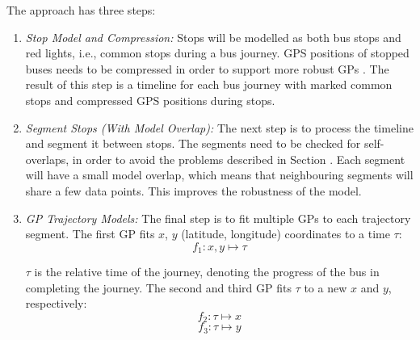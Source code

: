 The approach has three steps:
\begin{enumerate}
    \item \textit{Stop Model and Compression:}
    Stops will be modelled as both bus stops and red lights, i.e., common stops during a bus journey.
    GPS positions of stopped buses needs to be compressed in order to support more robust GPs .
    The result of this step is a timeline for each bus journey with marked common stops and compressed GPS positions during stops.

    \item \textit{Segment Stops (With Model Overlap):}
    The next step is to process the timeline and segment it between stops.
    The segments need to be checked for self-overlaps, in order to avoid the problems described in Section .
    Each segment will have a small model overlap, which means that neighbouring segments will share a few data points.
    This improves the robustness of the model.

    \item \textit{GP Trajectory Models:}
    The final step is to fit multiple GPs to each trajectory segment.
    The first GP fits $x$, $y$ (latitude, longitude) coordinates to a time $\tau$:
    \begin{equation}
       f_1: x, y \longmapsto \tau
    \end{equation}
    
    $\tau$ is the relative time of the journey, denoting the progress of the bus in completing the journey.
    The second and third GP fits $\tau$ to a new $x$ and $y$, respectively:
    \begin{equation}
        f_2: \tau \longmapsto x
    \end{equation}
    \begin{equation}
        f_3: \tau \longmapsto y
    \end{equation}
\end{enumerate}
